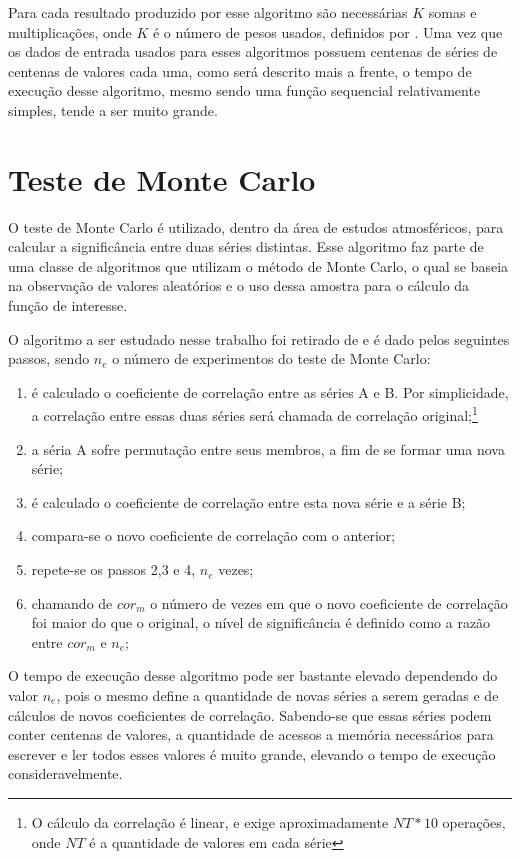 Para cada resultado produzido por esse algoritmo são necessárias $K$ somas e multiplicações, onde $K$ é o número de pesos usados, definidos por \cite{Duchon:1979}. Uma vez que os dados de entrada usados para esses algoritmos possuem centenas de séries de centenas de valores cada uma, como será descrito mais a frente, o tempo de execução desse algoritmo, mesmo sendo uma função sequencial relativamente simples, tende a ser muito grande.

\section{Teste de Monte Carlo}

O teste de Monte Carlo é utilizado, dentro da área de estudos atmosféricos, para calcular a significância entre duas séries distintas. Esse algoritmo faz parte de uma classe de algoritmos que utilizam o método de Monte Carlo, o qual se baseia na observação de valores aleatórios e o uso dessa amostra para o cálculo da função de interesse.

O algoritmo a ser estudado nesse trabalho foi retirado de \cite{Joao:2010} e é dado pelos seguintes passos, sendo $n_{e}$ o número de experimentos do teste de Monte Carlo:

\begin{enumerate}
\item  é calculado o coeficiente de correlação entre as séries A e B. Por simplicidade, a correlação entre essas duas séries será chamada de correlação original;\footnote{O cálculo da correlação é linear, e exige aproximadamente $NT*10$ operações, onde $NT$ é a quantidade de valores em cada série}

\item  a séria A sofre permutação entre seus membros, a fim de se formar uma nova série;

\item  é calculado o coeficiente de correlação entre esta nova série e a série B;

\item  compara-se o novo coeficiente de correlação com o anterior;

\item  repete-se os passos 2,3 e 4, $n_{e}$ vezes;

\item  chamando de $cor_{m}$ o número de vezes em que o novo coeficiente de correlação foi maior do que o original, o nível de significância é definido como a razão entre $cor_{m}$ e $n_{e}$;
\end{enumerate}

O tempo de execução desse algoritmo pode ser bastante elevado dependendo do valor $n_{e}$, pois o mesmo define a quantidade de novas séries a serem geradas e de cálculos de novos coeficientes de correlação. Sabendo-se que essas séries podem conter centenas de valores, a quantidade de acessos a memória necessários para escrever e ler todos esses valores é muito grande, elevando o tempo de execução consideravelmente.